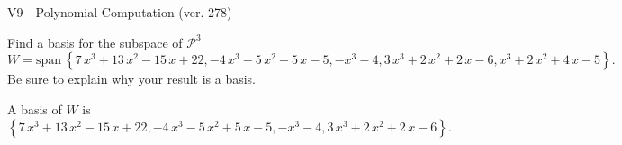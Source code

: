 \begin{exercise}
  \begin{exerciseTitle}V9 - Polynomial Computation (ver. 278)\end{exerciseTitle}
  \begin{exerciseStatement}
    Find a basis for the subspace of \(\mathcal{P}^3\) 
\[W=\mathrm{span}\ \left\{7 \, x^{3} + 13 \, x^{2} - 15 \, x + 22 , -4 \, x^{3} - 5 \, x^{2} + 5 \, x - 5 , -x^{3} - 4 , 3 \, x^{3} + 2 \, x^{2} + 2 \, x - 6 , x^{3} + 2 \, x^{2} + 4 \, x - 5\right\}.\]
 Be sure to explain why your result is a basis.


  \end{exerciseStatement}
  \begin{exerciseAnswer}
   A basis of \(W\) is  \(\left\{7 \, x^{3} + 13 \, x^{2} - 15 \, x + 22 , -4 \, x^{3} - 5 \, x^{2} + 5 \, x - 5 , -x^{3} - 4 , 3 \, x^{3} + 2 \, x^{2} + 2 \, x - 6\right\}\).
  


  \end{exerciseAnswer}
\end{exercise}